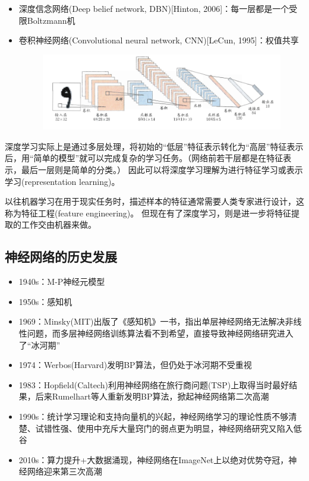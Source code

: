 \begin{itemize}
	\item 深度信念网络(Deep belief network, DBN)[Hinton, 2006]：每一层都是一个受限Boltzmann机
	\item 卷积神经网络(Convolutional neural network, CNN)[LeCun, 1995]：权值共享
\begin{figure}[H]
\centering
\includegraphics[width=0.8\linewidth]{fig/LeNet.png}
\end{figure}
\end{itemize}

深度学习实际上是通过多层处理，将初始的``低层''特征表示转化为``高层''特征表示后，用``简单的模型''就可以完成复杂的学习任务。（网络前若干层都是在特征表示，最后一层则是简单的分类。）
因此可以将深度学习理解为进行特征学习或表示学习(representation learning)。

以往机器学习在用于现实任务时，描述样本的特征通常需要人类专家进行设计，这称为特征工程(feature engineering)。
但现在有了深度学习，则是进一步将特征提取的工作交由机器来做。

\subsection{神经网络的历史发展}
\begin{itemize}
	\item 1940s：M-P神经元模型
	\item 1950s：感知机
	\item 1969：Minsky(MIT)出版了《感知机》一书，指出单层神经网络无法解决非线性问题，而多层神经网络训练算法看不到希望，直接导致神经网络研究进入了``冰河期''
	\item 1974：Werbos(Harvard)发明BP算法，但仍处于冰河期不受重视
	\item 1983：Hopfield(Caltech)利用神经网络在旅行商问题(TSP)上取得当时最好结果，后来Rumelhart等人重新发明BP算法，掀起神经网络第二次高潮
	\item 1990s：统计学习理论和支持向量机的兴起，神经网络学习的理论性质不够清楚、试错性强、使用中充斥大量窍门的弱点更为明显，神经网络研究又陷入低谷
	\item 2010s：算力提升+大数据涌现，神经网络在ImageNet上以绝对优势夺冠，神经网络迎来第三次高潮
\end{itemize}
